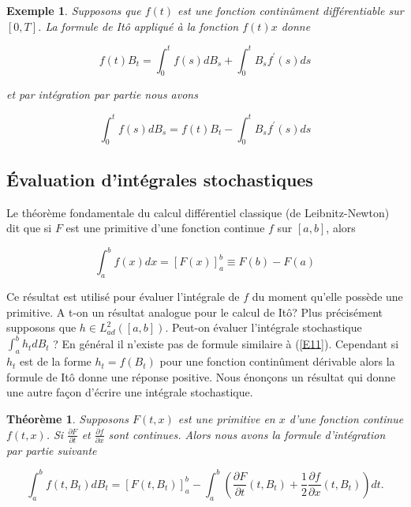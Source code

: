 \documentclass[A4paper,12pt]{report}
\newtheorem{theorem}{Th\'eor\`eme}[chapter]
\newtheorem{example}{Exemple}[chapter]
\begin{document}
\begin{example} Supposons que $f(t)$ est une fonction continûment différentiable sur $[0, T]$. La formule de Itô appliqué à la fonction $f(t) x$ donne

$$
f(t) B_{t}=\int_{0}^{t} f(s) d B_{s}+\int_{0}^{t} B_{s} f^{\prime}(s) d s
$$

et par intégration par partie nous avons

$$
\int_{0}^{t} f(s) d B_{s}=f(t) B_{t}-\int_{0}^{t} B_{s} f^\prime(s) d s
$$
\end{example}

\subsection{Évaluation d'intégrales stochastiques}
Le théorème fondamentale du calcul différentiel classique (de Leibnitz-Newton) dit que si $F$ est une primitive d'une fonction continue $f$ sur $[a, b]$, alors

\begin{equation} \label{E11}
\int_{a}^{b} f(x) d x=[F(x)]_{a}^{b} \equiv F(b)-F(a)
\end{equation}


Ce résultat est utilisé pour évaluer l'intégrale de $f$ du moment qu'elle possède une primitive. A t-on un résultat analogue pour le calcul de Itô? Plus précisément supposons que $h \in L_{a d}^{2}([a, b])$. Peut-on évaluer l'intégrale stochastique $\int_{a}^{b} h_{t} d B_{t}$ ? En général il n'existe pas de formule similaire à (\ref{E11}). Cependant si $h_{t}$ est de la forme $h_{t}=f\left(B_{t}\right)$ pour une fonction continûment dérivable alors la formule de Itô donne une réponse positive. Nous énonçons un résultat qui donne une autre façon d'écrire une intégrale stochastique.

\begin{theorem}
Supposons $F(t, x)$ est une primitive en $x$ d'une fonction continue $f(t, x)$. Si $\frac{\partial F}{\partial t}$ et $\frac{\partial f}{\partial x}$ sont continues. Alors nous avons la formule d'intégration par partie suivante

\begin{equation}\label{E12}
\int_{a}^{b} f\left(t, B_{t}\right) d B_{t}=\left[F\left(t, B_{t}\right)\right]_{a}^{b}-\int_{a}^{b}\left(\frac{\partial F}{\partial t}\left(t, B_{t}\right)+\frac{1}{2} \frac{\partial f}{\partial x}\left(t, B_{t}\right)\right) d t .
\end{equation}
\end{theorem}
\end{document}
